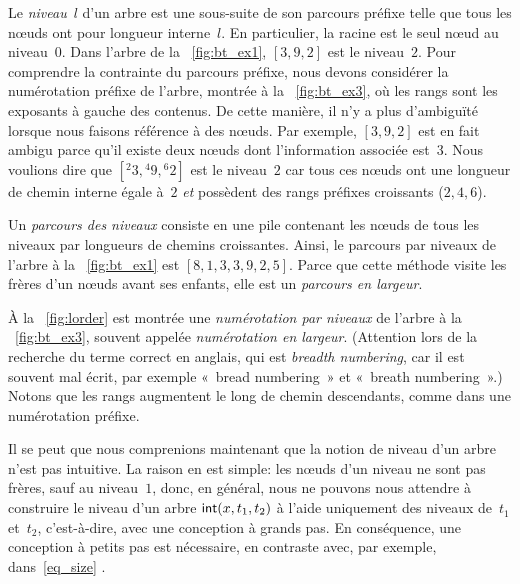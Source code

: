 
Le \emph{niveau}~\(l\) d'un arbre est une
sous-suite de son parcours préfixe telle
que tous les n{\oe}uds ont pour longueur
interne~\(l\). En particulier, la racine
est le seul n{\oe}ud au niveau~\(0\). Dans l'arbre de la
\fig~\vref{fig:bt_ex1}, \([3,9,2]\) est le niveau~\(2\). Pour
comprendre la contrainte du parcours préfixe, nous devons considérer
la numérotation préfixe de l'arbre, montrée à la
\fig~\vref{fig:bt_ex3}, où les rangs sont les exposants à gauche des
contenus. De cette manière, il n'y a plus d'ambiguïté lorsque nous
faisons référence à des n{\oe}uds. Par exemple, \([3,9,2]\) est en
fait ambigu parce qu'il existe deux n{\oe}uds dont l'information
associée est~\(3\). Nous voulions dire que \([{}^{2}{3}, {}^{4}{9},
{}^{6}{2}]\) est le niveau~\(2\) car tous ces n{\oe}uds ont une
longueur de chemin interne égale à~\(2\) \emph{et} possèdent des rangs
préfixes croissants (\(2,4,6\)).

Un \emph{parcours des niveaux} consiste en une pile contenant les n{\oe}uds de tous les
niveaux par longueurs de chemins croissantes. Ainsi, le parcours par
niveaux de l'arbre à la \fig~\vref{fig:bt_ex1} est
\([8,1,3,3,9,2,5]\). Parce que cette méthode visite les frères d'un
n{\oe}uds avant ses enfants, elle est un \emph{parcours en
  largeur}.

À la \fig~\vref{fig:lorder} est montrée une \emph{numérotation par
  niveaux} de l'arbre à la \fig~\vref{fig:bt_ex3}, souvent appelée
\emph{numérotation en largeur}. (Attention lors de la recherche du terme correct en
anglais, qui est \emph{breadth numbering}, car il est souvent mal
écrit, par exemple «~bread numbering~» et «~breath numbering~».) Notons
que les rangs augmentent le long de chemin descendants, comme dans une
numérotation préfixe.

Il se peut que nous comprenions maintenant que la notion de niveau
d'un arbre n'est pas intuitive. La raison en est simple: les n{\oe}uds
d'un niveau ne sont pas frères, sauf au
niveau~\(1\), donc, en général, nous ne pouvons nous attendre à
construire le niveau d'un arbre \(\textsf{int}(x,t_1,t_2)\) à l'aide
uniquement des niveaux de~\(t_1\) et~\(t_2\), c'est-à-dire, avec une
conception à grands pas. En conséquence,
une conception à petits pas est nécessaire, en contraste avec, par
exemple,  dans~\eqref{eq_size}
.


